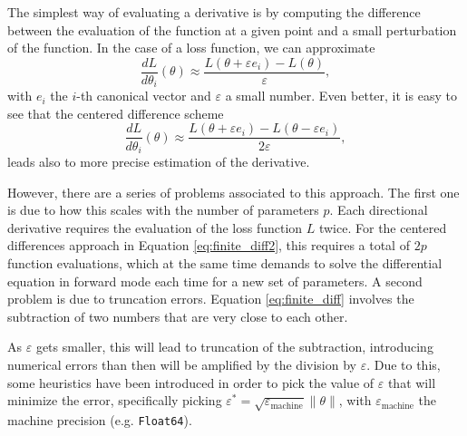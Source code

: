 The simplest way of evaluating a derivative is by computing the difference between the evaluation of the function at a given point and a small perturbation of the function. 
In the case of a loss function, we can approximate
\begin{equation}
 \frac{dL}{d\theta_i} (\theta) \approx \frac{L(\theta + \varepsilon e_i ) - L(\theta)}{\varepsilon},
 \label{eq:finite_diff}
\end{equation}
with $e_i$ the $i$-th canonical vector and $\varepsilon$ a small number. 
Even better, it is easy to see that the centered difference scheme
\begin{equation}
 \frac{dL}{d\theta_i} (\theta) \approx \frac{L(\theta + \varepsilon e_i ) - L(\theta - \varepsilon e_i)}{2\varepsilon},
 \label{eq:finite_diff2}
\end{equation}
leads also to more precise estimation of the derivative.

However, there are a series of problems associated to this approach.
The first one is due to how this scales with the number of parameters $p$.
Each directional derivative requires the evaluation of the loss function $L$ twice.
For the centered differences approach in Equation \eqref{eq:finite_diff2}, this requires a total of $2p$ function evaluations, which at the same time demands to solve the differential equation in forward mode each time for a new set of parameters.
A second problem is due to truncation errors.
Equation \eqref{eq:finite_diff} involves the subtraction of two numbers that are very close to each other.

As $\varepsilon$ gets smaller, this will lead to truncation of the subtraction, introducing numerical errors than then will be amplified by the division by $\varepsilon$.
Due to this, some heuristics have been introduced in order to pick the value of $\varepsilon$ that will minimize the error, specifically picking $\varepsilon^* = \sqrt{\varepsilon_\text{machine}} \| \theta \|$, with $\varepsilon_\text{machine}$ the machine precision (e.g. \texttt{Float64}).
 

